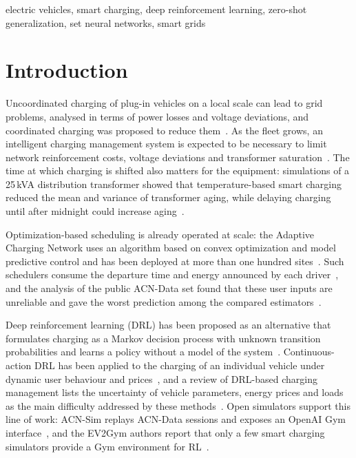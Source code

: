 \documentclass[conference]{IEEEtran}
\begin{document}
\begin{IEEEkeywords}
electric vehicles, smart charging, deep reinforcement learning, zero-shot generalization, set neural networks, smart grids
\end{IEEEkeywords}

\section{Introduction}
Uncoordinated charging of plug-in vehicles on a local scale can lead to grid problems, analysed
in terms of power losses and voltage deviations, and coordinated charging was proposed to reduce
them~\cite{clement2010impact}. As the fleet grows, an intelligent charging management system is
expected to be necessary to limit network reinforcement costs, voltage deviations and transformer
saturation~\cite{garcia2014review}. The time at which charging is shifted also matters for the
equipment: simulations of a 25\,kVA distribution transformer showed that temperature-based smart
charging reduced the mean and variance of transformer aging, while delaying charging until after
midnight could increase aging~\cite{hilshey2013transformer}.

Optimization-based scheduling is already operated at scale: the Adaptive Charging Network uses an
algorithm based on convex optimization and model predictive control and has been deployed at more
than one hundred sites~\cite{lee2021acn}. Such schedulers consume the departure time and energy
announced by each driver~\cite{lee2021acn}, and the analysis of the public ACN-Data set found that
these user inputs are unreliable and gave the worst prediction among the compared
estimators~\cite{lee2019acndata}.

Deep reinforcement learning (DRL) has been proposed as an alternative that formulates charging
as a Markov decision process with unknown transition probabilities and learns a policy without a
model of the system~\cite{wan2019modelfree}. Continuous-action DRL has been applied to the
charging of an individual vehicle under dynamic user behaviour and prices~\cite{yan2021sac}, and
a review of DRL-based charging management lists the uncertainty of vehicle parameters, energy
prices and loads as the main difficulty addressed by these methods~\cite{abdullah2021review}.
Open simulators support this line of work: ACN-Sim replays ACN-Data sessions and exposes an
OpenAI Gym interface~\cite{lee2021acnsim}, and the EV2Gym authors report that only a few smart
charging simulators provide a Gym environment for RL~\cite{orfanoudakis2025ev2gym}.
\end{document}

